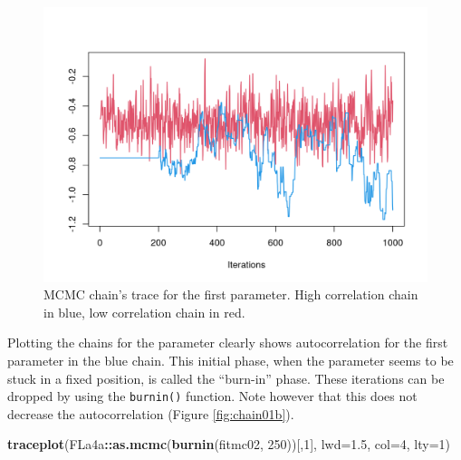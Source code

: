 \documentclass[
]{book}
\newenvironment{Shaded}{\begin{snugshade}}{\end{snugshade}}
\newcommand{\AttributeTok}[1]{\textcolor[rgb]{0.13,0.29,0.53}{#1}}
\newcommand{\DecValTok}[1]{\textcolor[rgb]{0.00,0.00,0.81}{#1}}
\newcommand{\FloatTok}[1]{\textcolor[rgb]{0.00,0.00,0.81}{#1}}
\newcommand{\FunctionTok}[1]{\textcolor[rgb]{0.13,0.29,0.53}{\textbf{#1}}}
\newcommand{\NormalTok}[1]{#1}
\newcommand{\SpecialCharTok}[1]{\textcolor[rgb]{0.81,0.36,0.00}{\textbf{#1}}}
\begin{document}
\begin{figure}
\centering
\includegraphics{_bookdown_files/_main_files/figure-html/chain01-1.png}
\caption{\label{fig:chain01}MCMC chain's trace for the first parameter. High correlation chain in blue, low correlation chain in red.}
\end{figure}

Plotting the chains for the parameter clearly shows autocorrelation for the first parameter in the blue chain. This initial phase, when the parameter seems to be stuck in a fixed position, is called the ``burn-in'' phase. These iterations can be dropped by using the \texttt{burnin()} function. Note however that this does not decrease the autocorrelation (Figure \ref{fig:chain01b}).

\begin{Shaded}
\begin{Highlighting}[]
\FunctionTok{traceplot}\NormalTok{(FLa4a}\SpecialCharTok{::}\FunctionTok{as.mcmc}\NormalTok{(}\FunctionTok{burnin}\NormalTok{(fitmc02, }\DecValTok{250}\NormalTok{))[,}\DecValTok{1}\NormalTok{], }\AttributeTok{lwd=}\FloatTok{1.5}\NormalTok{, }\AttributeTok{col=}\DecValTok{4}\NormalTok{, }\AttributeTok{lty=}\DecValTok{1}\NormalTok{)}
\end{Highlighting}
\end{Shaded}
\end{document}
